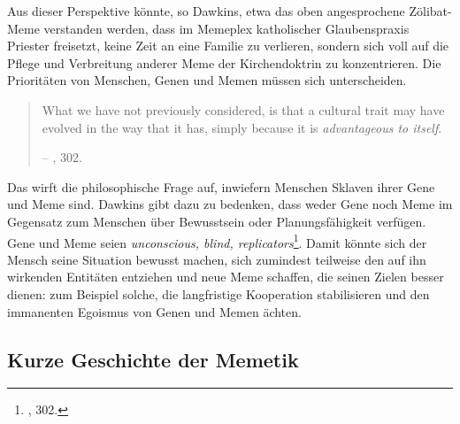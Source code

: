 \documentclass[openany,twoside,twocolumn]{book}
\let\rmarkdownfootnote\footnote%
\def\footnote{\protect\rmarkdownfootnote}
\begin{document}
Aus dieser Perspektive könnte, so Dawkins, etwa das oben angesprochene
Zölibat-Meme verstanden werden, dass im Memeplex katholischer
Glaubenspraxis Priester freisetzt, keine Zeit an eine Familie zu
verlieren, sondern sich voll auf die Pflege und Verbreitung anderer Meme
der Kirchendoktrin zu konzentrieren. Die Prioritäten von Menschen, Genen
und Memen müssen sich unterscheiden.

\begin{quote}
What we have not previously considered, is that a cultural trait may
have evolved in the way that it has, simply because it is
\emph{advantageous to itself}.

-- \textcite{Dawkinsselfishgene40th2016}, 302.
\end{quote}

Das wirft die philosophische Frage auf, inwiefern Menschen Sklaven ihrer
Gene und Meme sind. Dawkins gibt dazu zu bedenken, dass weder Gene noch
Meme im Gegensatz zum Menschen über Bewusstsein oder Planungsfähigkeit
verfügen. Gene und Meme seien \emph{unconscious, blind,
replicators}\footnote{\textcite{Dawkinsselfishgene40th2016}, 302.}.
Damit könnte sich der Mensch seine Situation bewusst machen, sich
zumindest teilweise den auf ihn wirkenden Entitäten entziehen und neue
Meme schaffen, die seinen Zielen besser dienen: zum Beispiel solche, die
langfristige Kooperation stabilisieren und den immanenten Egoismus von
Genen und Memen ächten.

\hypertarget{memetics-history}{%
\subsection{Kurze Geschichte der Memetik}\label{memetics-history}}
\end{document}
